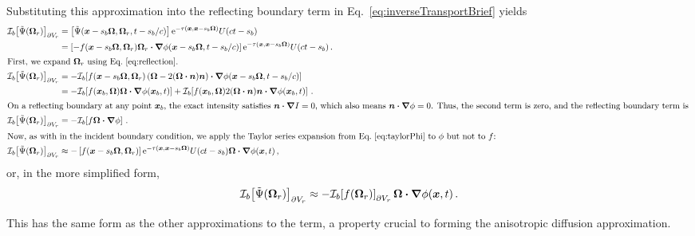 Substituting this approximation into the reflecting boundary term in
Eq.~\eqref{eq:inverseTransportBrief} yields
\begin{align*}
\lopinv{b}{\tilde\Psi(\vec{\Omega}_r)}_{\partial V_r}
  &= \left[\tilde\Psi(\vec{x} - s_b\vec{\Omega}, \vec{\Omega}_r, t - s_b/c)
  \right]
    \eexp^{ -\tau(\vec{x}, \vec{x} - s_b \vec{\Omega})}
    U(ct - s_b)
\\
  &= \left[-f(\vec{x} - s_b\vec{\Omega}, \vec{\Omega}_r) \vec{\Omega}_r 
  \vd \grad \phi(\vec{x} - s_b\vec{\Omega}, t - s_b/c) \right]
  \eexp^{ -\tau(\vec{x}, \vec{x} - s_b \vec{\Omega})}
  U(ct - s_b) \,.
\\ 
\intertext{First, we expand $\vec{\Omega}_r$ using Eq.~\eqref{eq:reflection}.
}
\lopinv{b}{\tilde\Psi(\vec{\Omega}_r)}_{\partial V_r}
  &= - \lopinv{b}{f(\vec{x} - s_b\vec{\Omega}, \vec{\Omega}_r)
\left(  \vec{\Omega} - 2(\vec{\Omega} \vd \vec{n}) \vec{n} \right)
  \vd \grad \phi(\vec{x} - s_b\vec{\Omega}, t - s_b/c) }
  \\
  &= -\lopinv{b}{f(\vec{x}_b,\vec{\Omega}) \vec{\Omega} \vd \grad
  \phi(\vec{x}_b,t)}
  + \lopinv{b}{f(\vec{x}_b,\vec{\Omega}) 2(\vec{\Omega} \vd \vec{n}) \vec{n} \vd
  \grad \phi(\vec{x}_b,t) } \,.
\\ 
\intertext{On a reflecting boundary at any point $\vec{x}_b$, the exact
intensity satisfies $\vec{n} \vd
\grad I = 0$, which also means $\vec{n} \vd \grad \phi=0$. Thus, the second
term is zero, and the reflecting boundary term is
}
\lopinv{b}{\tilde\Psi(\vec{\Omega}_r)}_{\partial V_r}
&= -\lopinv{b}{f \vec{\Omega} \vd \grad \phi} \,.
\\ \intertext{Now, as with in the incident boundary condition, we apply the
Taylor
series expansion from Eq.~\eqref{eq:taylorPhi} to $\phi$ but not to $f$:
}
\lopinv{b}{\tilde\Psi(\vec{\Omega}_r)}_{\partial V_r}
&\approx
-\left[f(\vec{x} - s_b\vec{\Omega}, \vec{\Omega}_r)
  \right]
  \eexp^{ -\tau(\vec{x}, \vec{x} - s_b \vec{\Omega})}
  U(ct - s_b) \vec{\Omega} \vd \grad \phi(\vec{x}, t)\,,
\end{align*}
or, in the more simplified form,
\begin{equation} \label{eq:reflApprox}
\mathcal{I}_{b}\!\left[\tilde\Psi(\bm{\Omega}_r)\right]_{\partial V_r}
\approx  
- \mathcal{I}_{b}\!\left[f(\bm{\Omega}_r)\right]_{\partial V_r}
\bm{\Omega} \bm{\cdot} \bm{\nabla} \phi(\bm{x}, t) \,.
\end{equation}

This has the same form as the other approximations to the term, a property crucial
to forming the anisotropic diffusion approximation.

